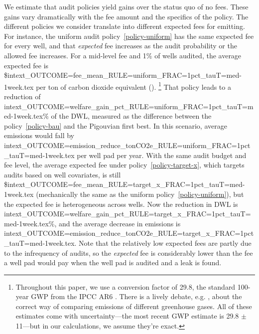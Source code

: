 We estimate that audit policies yield gains over the status quo of no fees.
These gains vary dramatically with the fee amount and the specifics of the policy.
The different policies we consider translate into different expected fees for emitting.
For instance, the uniform audit policy~\ref{policy-uniform} has the same expected fee for every well, and that \textit{expected} fee increases as the audit probability or the allowed fee increases.
For a mid-level fee and 1\% of wells audited, the average expected fee is
\${intext_OUTCOME=fee_mean_RULE=uniform_FRAC=1pct_tauT=med-1week.tex} per ton of carbon dioxide equivalent ().%
\footnote{%
\label{fn:gwp}
Throughout this paper, we use a  conversion factor of 29.8, the standard 100-year \gls{GWP} from the \gls{IPCC} AR6 \parencite{ipcc_ar6_methane_gwp}.
There is a lively debate, e.g. \textcite{Allen/Shine/Fuglestvedt/Millar/Cain/Frame/Macey:2018}, about the correct way of comparing emissions of different greenhouse gases.
All of these estimates come with uncertainty---the most recent \gls{GWP} estimate is 29.8 \(\pm\) 11---but in our calculations, we assume they're exact.
}
That policy leads to a reduction of
{intext_OUTCOME=welfare_gain_pct_RULE=uniform_FRAC=1pct_tauT=med-1week.tex}\%
of the \gls{DWL}, measured as the difference between the policy~\ref{policy-bau} and the Pigouvian first best.
In this scenario, average emissions would fall by
{intext_OUTCOME=emission_reduce_tonCO2e_RULE=uniform_FRAC=1pct_tauT=med-1week.tex}
 per well pad per year.
With the same audit budget and fee level, the average expected fee under policy~\ref{policy-target-x}, which targets audits based on well covariates, is still
\${intext_OUTCOME=fee_mean_RULE=target_x_FRAC=1pct_tauT=med-1week.tex} (mechanically the same as the uniform policy~\ref{policy-uniform}), but the expected fee is heterogeneous across wells.
Now the reduction in \gls{DWL} is
{intext_OUTCOME=welfare_gain_pct_RULE=target_x_FRAC=1pct_tauT=med-1week.tex}\%,
and the average decrease in emissions is
{intext_OUTCOME=emission_reduce_tonCO2e_RULE=target_x_FRAC=1pct_tauT=med-1week.tex}.
Note that the relatively low expected fees are partly due to the infrequency of audits, so the \emph{expected} fee is considerably lower than the fee a well pad would pay when the well pad is audited and a leak is found.

